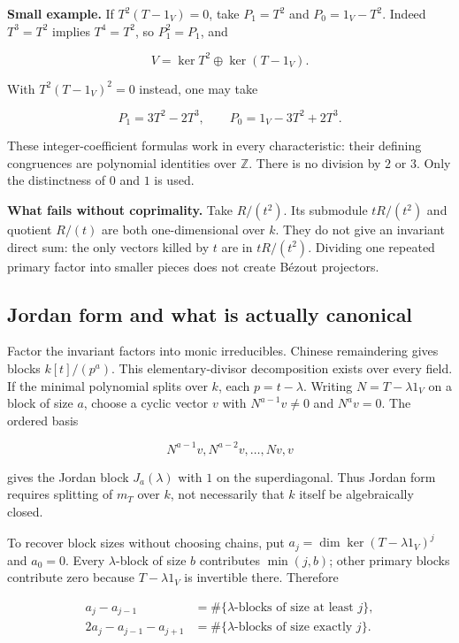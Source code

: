 \documentclass[
  11pt,
]{article}
\begin{document}
\textbf{Small example.} If \(T^2(T-1_V)=0\), take \(P_1=T^2\) and
\(P_0=1_V-T^2\). Indeed \(T^3=T^2\) implies \(T^4=T^2\), so
\(P_1^2=P_1\), and

\[V=\ker T^2\oplus\ker(T-1_V).\]

With \(T^2(T-1_V)^2=0\) instead, one may take

\[P_1=3T^2-2T^3,\qquad P_0=1_V-3T^2+2T^3.\]

These integer-coefficient formulas work in every characteristic: their
defining congruences are polynomial identities over \(\mathbb Z\). There
is no division by \(2\) or \(3\). Only the distinctness of \(0\) and
\(1\) is used.

\textbf{What fails without coprimality.} Take \(R/(t^2)\). Its submodule
\(tR/(t^2)\) and quotient \(R/(t)\) are both one-dimensional over \(k\).
They do not give an invariant direct sum: the only vectors killed by
\(t\) are in \(tR/(t^2)\). Dividing one repeated primary factor into
smaller pieces does not create Bézout projectors.

\subsection{Jordan form and what is actually
canonical}\label{jordan-form-and-what-is-actually-canonical}

Factor the invariant factors into monic irreducibles. Chinese
remaindering gives blocks \(k[t]/(p^a)\). This elementary-divisor
decomposition exists over every field. If the minimal polynomial splits
over \(k\), each \(p=t-\lambda\). Writing \(N=T-\lambda1_V\) on a block
of size \(a\), choose a cyclic vector \(v\) with \(N^{a-1}v\ne0\) and
\(N^av=0\). The ordered basis

\[N^{a-1}v,N^{a-2}v,\ldots,Nv,v\]

gives the Jordan block \(J_a(\lambda)\) with \(1\) on the superdiagonal.
Thus Jordan form requires splitting of \(m_T\) over \(k\), not
necessarily that \(k\) itself be algebraically closed.

To recover block sizes without choosing chains, put
\(a_j=\dim\ker(T-\lambda1_V)^j\) and \(a_0=0\). Every \(\lambda\)-block
of size \(b\) contributes \(\min(j,b)\); other primary blocks contribute
zero because \(T-\lambda1_V\) is invertible there. Therefore

\[\begin{aligned}
a_j-a_{j-1}&=\#\{\lambda\text{-blocks of size at least }j\},\\
2a_j-a_{j-1}-a_{j+1}&=\#\{\lambda\text{-blocks of size exactly }j\}.
\end{aligned}\]
\end{document}
